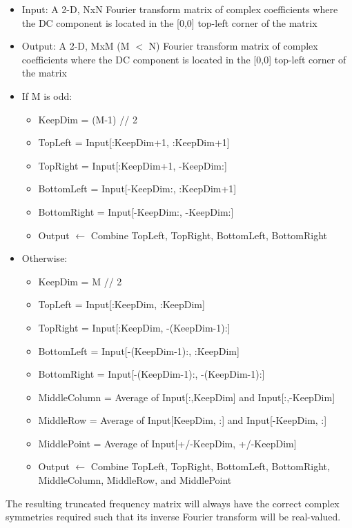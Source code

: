 \documentclass[10pt,journal,compsoc]{IEEEtran}
\begin{document}
\begin{itemize}
    \item Input: A 2-D, NxN Fourier transform matrix of complex coefficients where the DC component is located in the [0,0] top-left corner of the matrix
    \item Output: A 2-D, MxM (M $<$ N) Fourier transform matrix of complex coefficients where the DC component is located in the [0,0] top-left corner of the matrix
    \item If M is odd:
    \begin{itemize}
        \item KeepDim = (M-1) // 2
        \item TopLeft = Input[:KeepDim+1, :KeepDim+1]
        \item TopRight = Input[:KeepDim+1, -KeepDim:]
        \item BottomLeft = Input[-KeepDim:, :KeepDim+1]
        \item BottomRight = Input[-KeepDim:, -KeepDim:]
        \item Output $\leftarrow$ Combine TopLeft, TopRight, BottomLeft, BottomRight
    \end{itemize}
    \item Otherwise:
    \begin{itemize}
        \item KeepDim = M // 2
        \item TopLeft = Input[:KeepDim, :KeepDim]
        \item TopRight = Input[:KeepDim, -(KeepDim-1):]
        \item BottomLeft = Input[-(KeepDim-1):, :KeepDim]
        \item BottomRight = Input[-(KeepDim-1):, -(KeepDim-1):]
        \item MiddleColumn = Average of Input[:,KeepDim] and Input[:,-KeepDim]
        \item MiddleRow = Average of Input[KeepDim, :] and Input[-KeepDim, :]
        \item MiddlePoint = Average of Input[+/-KeepDim, +/-KeepDim]
        \item Output $\leftarrow$ Combine TopLeft, TopRight, BottomLeft, BottomRight, MiddleColumn, MiddleRow, and MiddlePoint
    \end{itemize}
\end{itemize}

The resulting truncated frequency matrix will always have the correct complex symmetries required such that its inverse Fourier transform will be real-valued.
\end{document}
